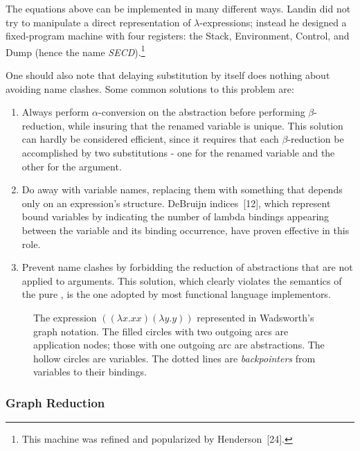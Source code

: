 The equations above can be implemented in many different ways. Landin did not
try to manipulate a direct representation of \(\lambda\)-expressions; instead he
designed a fixed-program machine with four registers: the Stack, Environment,
Control, and Dump (hence the name \emph{SECD}).\footnote{This machine was refined and
popularized by Henderson~[24].}

One should also note that delaying substitution by itself does nothing about
avoiding name clashes. Some common solutions to this problem are:

\begin{enumerate}
\item Always perform \(\alpha\)-conversion on the abstraction before performing
\(\beta\)-reduction, while insuring that the renamed variable is unique. This
solution can hardly be considered efficient, since it requires that each
\(\beta\)-reduction be accomplished by two substitutions - one for the renamed
variable and the other for the argument.
\item Do away with variable names, replacing them with something that depends
only on an expression's structure. DeBruijn indices~[12], which represent bound
variables by indicating the number of lambda bindings appearing between the
variable and its binding occurrence, have proven effective in this role.
\item Prevent name clashes by forbidding the reduction of abstractions that are
not applied to arguments. This solution, which clearly violates the semantics of
the pure \lambdacalculus, is the one adopted by most functional language
implementors.
\end{enumerate}


\begin{figure}
\centering
{}
\caption[Representation of expressions in Wadsworth's graph notation]{The expression \(((\lambda x.xx)(\lambda y.y))\) represented in
Wadsworth's graph notation. The filled circles with two outgoing arcs are
application nodes; those with one outgoing arc are abstractions. The hollow
circles are variables. The dotted lines are \emph{backpointers} from variables to their
bindings.}
\end{figure}

\subsubsection*{Graph Reduction}


